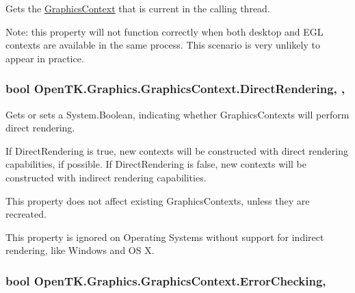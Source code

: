 Gets the \hyperlink{class_open_t_k_1_1_graphics_1_1_graphics_context}{Graphics\-Context} that is current in the calling thread. 

Note\-: this property will not function correctly when both desktop and E\-G\-L contexts are available in the same process. This scenario is very unlikely to appear in practice. \hypertarget{class_open_t_k_1_1_graphics_1_1_graphics_context_a2c0431903a5da942e015be0847f070bb}{
\subsubsection[{Direct\-Rendering}]{\setlength{\rightskip}{0pt plus 5cm}bool Open\-T\-K.\-Graphics.\-Graphics\-Context.\-Direct\-Rendering\hspace{0.3cm}{\ttfamily [static]}, {\ttfamily [get]}, {\ttfamily [set]}}}\label{class_open_t_k_1_1_graphics_1_1_graphics_context_a2c0431903a5da942e015be0847f070bb}


Gets or sets a System.\-Boolean, indicating whether Graphics\-Contexts will perform direct rendering.

If Direct\-Rendering is true, new contexts will be constructed with direct rendering capabilities, if possible. If Direct\-Rendering is false, new contexts will be constructed with indirect rendering capabilities. 

This property does not affect existing Graphics\-Contexts, unless they are recreated.

This property is ignored on Operating Systems without support for indirect rendering, like Windows and O\-S X. \hypertarget{class_open_t_k_1_1_graphics_1_1_graphics_context_a8ad06302403c5503b6ba954676523d90}{
\subsubsection[{Error\-Checking}]{\setlength{\rightskip}{0pt plus 5cm}bool Open\-T\-K.\-Graphics.\-Graphics\-Context.\-Error\-Checking\hspace{0.3cm}{\ttfamily [get]}, {\ttfamily [set]}}}\label{class_open_t_k_1_1_graphics_1_1_graphics_context_a8ad06302403c5503b6ba954676523d90}


